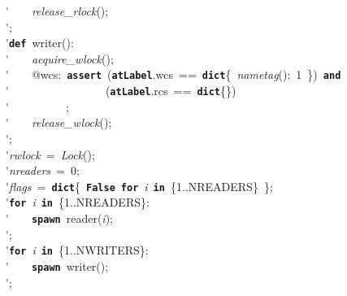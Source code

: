 \'\>~~~~\textit{release\_rlock}();\\

\'\>;\\

\'\>\texttt{\textbf{def}}~writer():\\

\'\>~~~~\textit{acquire\_wlock}();\\

\'\>~~~~@wcs:~\texttt{\textbf{assert}}~(\texttt{\textbf{atLabel}}.wcs~==~\texttt{\textbf{dict}}\{~\textit{nametag}():~1~\})~\texttt{\textbf{and}}\\

\'\>~~~~~~~~~~~~~~~~~(\texttt{\textbf{atLabel}}.rcs~==~\texttt{\textbf{dict}}\{\})\\

\'\>~~~~~~~~~~;\\

\'\>~~~~\textit{release\_wlock}();\\

\'\>;\\

\'\>\textit{rwlock}~=~\textit{Lock}();\\

\'\>\textit{nreaders}~=~0;\\

\'\>\textit{flags}~=~\texttt{\textbf{dict}}\{~\texttt{\textbf{False}}~\texttt{\textbf{for}}~\textit{i}~\texttt{\textbf{in}}~\{1..NREADERS\}~\};\\

\'\>\texttt{\textbf{for}}~\textit{i}~\texttt{\textbf{in}}~\{1..NREADERS\}:\\

\'\>~~~~\texttt{\textbf{spawn}}~reader(\textit{i});\\

\'\>;\\

\'\>\texttt{\textbf{for}}~\textit{i}~\texttt{\textbf{in}}~\{1..NWRITERS\}:\\

\'\>~~~~\texttt{\textbf{spawn}}~writer();\\

\'\>;